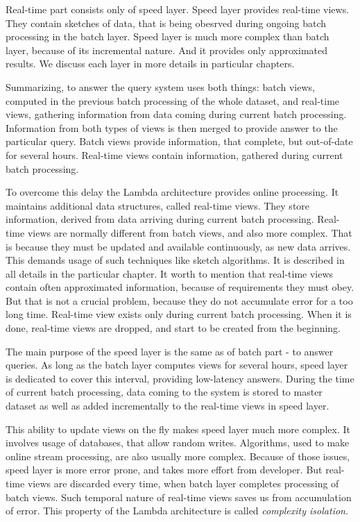
Real-time part consists only of speed layer.
Speed layer provides real-time views.
They contain sketches of data, that is being obesrved during ongoing batch processing in the batch layer.
Speed layer is much more complex than batch layer, because of its incremental nature.
And it provides only approximated results.
We discuss each layer in more details in particular chapters.

Summarizing, to answer the query system uses both things: batch views, computed
in the previous batch processing of the whole dataset, and real-time views,
gathering information from data coming during current batch processing.
Information from both types of views is then merged to provide answer to the
particular query.
Batch views provide information, that complete, but out-of-date for
several hours.
Real-time views contain information, gathered during current batch processing.

To overcome this delay the Lambda architecture provides online processing.
It maintains additional data structures, called real-time views.
They store information, derived from data arriving during current batch
processing.
Real-time views are normally different from batch views, and also more complex.
That is because they must be updated and available continuously, as new data
arrives.
This demands usage of such techniques like sketch algorithms.
It is described in all details in the particular chapter.
It worth to mention that real-time views contain often approximated information,
because of requirements they must obey.
But that is not a crucial problem, because they do not accumulate error for a
too long time.
Real-time view exists only during current batch processing.
When it is done, real-time views are dropped, and start to be created from the
beginning.

The main purpose of the speed layer is the same as of batch part - to answer
queries.
As long as the batch layer computes views for several hours, speed layer is
dedicated to cover this interval, providing low-latency answers.
During the time of current batch processing, data coming to the system is stored
to master dataset as well as added incrementally to the real-time views in
speed layer.

This ability to update views on the fly makes speed layer much more complex.
It involves usage of databases, that allow random writes.
Algorithms, used to make online stream processing, are also usually more
complex.
Because of those issues, speed layer is more error prone, and takes more effort
from developer.
But real-time views are discarded every time, when batch layer completes
processing of batch views.
Such temporal nature of real-time views saves us from accumulation of
error.
This property of the Lambda architecture is called \textit{complexity isolation}.

